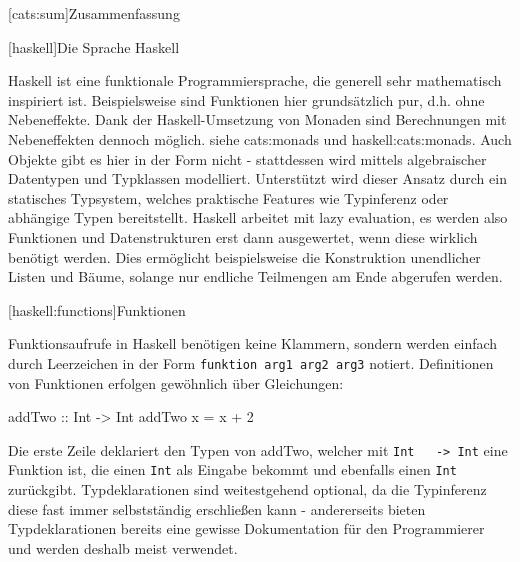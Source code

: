 \documentclass[11pt, a4paper, bibgerm]{book}
\newcommand\icode[1]{\lstinline?#1?}
\newcommand\lchapter{}
\newcommand\lsection{}
\newcommand\sref{}
\begin{document}
\lsection[cats:sum]{Zusammenfassung}

\lchapter[haskell]{Die Sprache Haskell}

Haskell ist eine funktionale Programmiersprache, die generell sehr
mathematisch inspiriert ist. Beispielsweise sind Funktionen hier
grundsätzlich pur, d.h. ohne Nebeneffekte. Dank der Haskell-Umsetzung
von Monaden sind Berechnungen mit Nebeneffekten dennoch möglich. siehe
\sref{cats:monads} und \sref{haskell:cats:monads}. Auch Objekte gibt es
hier in der Form nicht - stattdessen wird mittels algebraischer
Datentypen und Typklassen modelliert. Unterstützt wird dieser Ansatz
durch ein statisches Typsystem, welches praktische Features wie
Typinferenz oder abhängige Typen bereitstellt. Haskell arbeitet mit lazy
evaluation, es werden also Funktionen und Datenstrukturen erst dann
ausgewertet, wenn diese wirklich benötigt werden. Dies ermöglicht
beispielsweise die Konstruktion unendlicher Listen und Bäume, solange
nur endliche Teilmengen am Ende abgerufen werden.

\lsection[haskell:functions]{Funktionen}

Funktionsaufrufe in Haskell benötigen keine Klammern, sondern werden
einfach durch Leerzeichen in der Form \icode{funktion arg1 arg2 arg3}
notiert. Definitionen von Funktionen erfolgen gewöhnlich über
Gleichungen:
\begin{code}
addTwo :: Int -> Int
addTwo x = x + 2  
\end{code}
Die erste Zeile deklariert den Typen von addTwo, welcher mit \icode{Int
  -> Int} eine Funktion ist, die einen \icode{Int} als Eingabe bekommt
und ebenfalls einen \icode{Int} zurückgibt. Typdeklarationen sind
weitestgehend optional, da die Typinferenz diese fast immer
selbstständig erschließen kann - andererseits bieten Typdeklarationen
bereits eine gewisse Dokumentation für den Programmierer und werden
deshalb meist verwendet.
\end{document}
